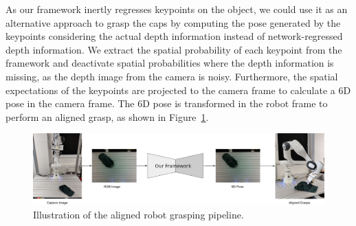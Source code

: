 As our framework inertly regresses keypoints on the object, we could use it as an alternative approach to grasp the caps by computing the pose
generated by the keypoints considering the actual depth information instead of network-regressed depth information.
We extract the spatial probability of each keypoint from the framework and deactivate spatial probabilities where the depth information is missing,
as the depth image from the camera is noisy. Furthermore, the spatial expectations of the keypoints are projected to the camera frame
to calculate a 6D pose in the camera frame. The 6D pose is transformed in the robot frame to perform an aligned grasp, as shown in Figure~\ref{fig:aligned_grasp}.

\begin{figure}[htb]
    \centering
    \includegraphics[scale=0.15]{../images/aligned.png}
    \caption{Illustration of the aligned robot grasping pipeline.}
    \label{fig:aligned_grasp}
\end{figure}

